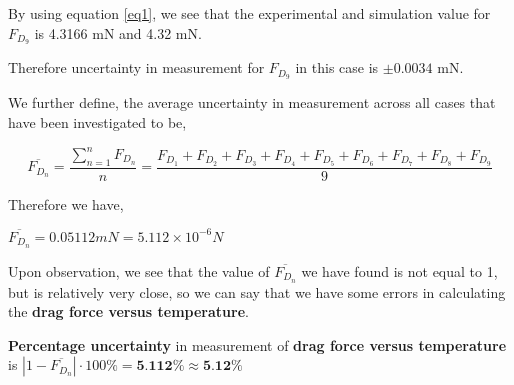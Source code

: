 	{By using equation \ref{eq1}, we see that the experimental and simulation value for $F_{D_9}$ is 4.3166 mN and 4.32 mN.}
        
	{Therefore uncertainty in measurement for $F_{D_9}$ in this case is $\pm{\textit{0.0034}}$ mN.}
        

        

        




{We further define, the average uncertainty in measurement across all cases that have been investigated to be,} 

    $$\overline{F_{D_n}} = \frac{\sum_{n=1}^{n}F_{D_n}}{n} = \frac{F_{D_1} + F_{D_2} + F_{D_3} + F_{D_4} + F_{D_5} + F_{D_6} + F_{D_7} + F_{D_8} + F_{D_9}}{9}$$

{Therefore we have,}

    $\overline{F_{D_n}} = 0.05112 mN = 5.112\times 10^{-6} N$

{Upon observation, we see that the value of $\overline{F_{D_n}}$ we have found is not equal to 1, but is relatively very close, so we can say that we have some errors in calculating the \textbf{drag force versus temperature}.}
        
        {\textbf{Percentage uncertainty} in measurement of \textbf{drag force versus temperature} is $\left|1-\overline{F_{D_n}}\right|\cdot{100\%} = \textbf{5.112\%} \approx \textbf{5.12\%}$}
        



